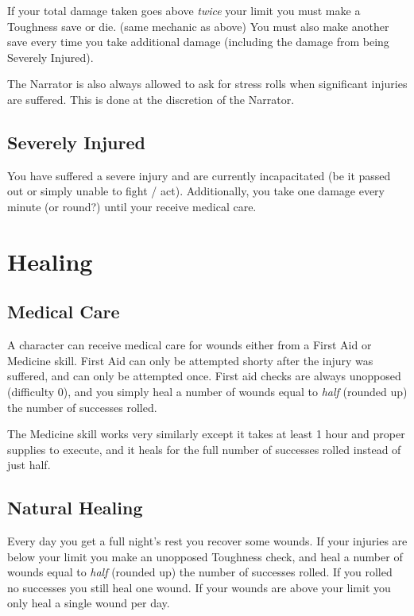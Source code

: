 If your total damage taken goes above \textit{twice} your limit you must make a Toughness save or die. (same mechanic as above)  
You must also make another save every time you take additional damage (including the damage from being Severely Injured).

The Narrator is also always allowed to ask for stress rolls when significant injuries are suffered. 
This is done at the discretion of the Narrator.


\subsection{Severely Injured}
You have suffered a severe injury and are currently incapacitated (be it passed out or simply unable to fight / act).
Additionally, you take one damage every minute (or round?) until your receive medical care.


\section{Healing}

\subsection{Medical Care}
A character can receive medical care for wounds either from a First Aid or Medicine skill.
First Aid can only be attempted shorty after the injury was suffered, and can only be attempted once.
First aid checks are always unopposed (difficulty 0), 
and you simply heal a number of wounds equal to \textit{half} (rounded up) the number of successes rolled.

The Medicine skill works very similarly except it takes at least 1 hour and proper supplies to execute,
and it heals for the full number of successes rolled instead of just half.

\subsection{Natural Healing}
Every day you get a full night's rest you recover some wounds. 
If your injuries are below your limit you make an unopposed Toughness check,
and heal a number of wounds equal to \textit{half} (rounded up) the number of successes rolled. 
If you rolled no successes you still heal one wound.
If your wounds are above your limit you only heal a single wound per day.

